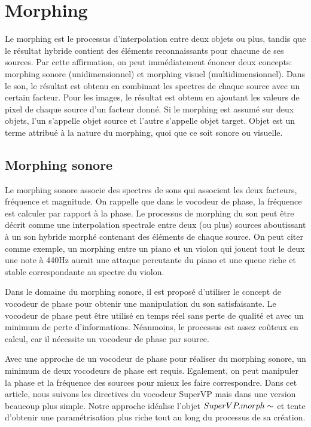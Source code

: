 \section{Morphing}

Le morphing est le processus d'interpolation entre deux objets ou plus, tandis que le résultat hybride contient des éléments reconnaissants pour chacune de ses sources. Par cette affirmation, on peut immédiatement énoncer deux concepts: morphing sonore (unidimensionnel) et morphing visuel (multidimensionnel). Dans le son, le résultat est obtenu en combinant les spectres de chaque source avec un certain facteur. Pour les images, le résultat est obtenu en ajoutant les valeurs de pixel de chaque source d’un facteur donné. Si le morphing est assumé sur deux objets, l'un s'appelle objet source et l'autre s'appelle objet target. Objet est un terme attribué à la nature du morphing, quoi que ce soit sonore ou visuelle.

    \subsection{Morphing sonore}
    
Le morphing sonore associe des spectres de sons qui associent les deux facteurs, fréquence et magnitude. On rappelle que dans le vocodeur de phase, la fréquence est calculer par rapport à la phase. Le processus de morphing du son peut être décrit comme une interpolation spectrale entre deux (ou plus) sources aboutissant à un son hybride morphé contenant des éléments de chaque source. On peut citer comme exemple, un morphing entre un piano et un violon qui jouent tout le deux une note à 440Hz aurait une attaque percutante du piano et une queue riche et stable correspondante au spectre du violon.

Dans le domaine du morphing sonore, il est proposé d’utiliser le concept de vocodeur de phase pour obtenir une manipulation du son satisfaisante. Le vocodeur de phase peut être utilisé en temps réel sans perte de qualité et avec un minimum de perte d'informations. Néanmoins, le processus est assez coûteux en calcul, car il nécessite un vocodeur de phase par source.

Avec une approche de un vocodeur de phase pour réaliser du morphing sonore, un minimum de deux vocodeurs de phase est requis. Egalement, on peut manipuler la phase et la fréquence des sources pour mieux les faire correspondre. Dans cet article, nous suivons les directives du vocodeur SuperVP mais dans une version beaucoup plus simple. Notre approche idéalise l'objet $SuperVP.morph \thicksim $ et tente d'obtenir une paramétrisation plus riche tout au long du processus de sa création.

